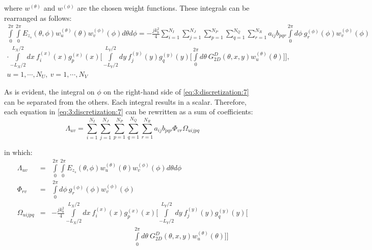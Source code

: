 		\noindent where $w^{(\theta)}$ and $w^{(\phi)}$ are the chosen weight functions. These integrals can be rearranged as follows:
 		\begin{multline}
 			\int\limits_{0}^{2\pi}\int\limits_{0}^{2\pi} E_{z_s}(\theta,\phi) w^{(\theta)}_u(\theta) w^{(\phi)}_v(\phi) d\theta d\phi =
 			-\frac{jk_b^2}{4} \sum\limits_{i=1}^{N_I}\sum\limits_{j=1}^{N_J} \sum\limits_{p=1}^{N_P}\sum\limits_{q=1}^{N_Q}\sum\limits_{r=1}^{N_R} a_{ij} b_{pqr} \int\limits_{0}^{2\pi} d\phi~ g^{(\phi)}_r(\phi) w^{(\phi)}_v(\phi) \\ \cdot  \int\limits_{-L_X/2}^{L_X/2} dx~ f^{(x)}_i(x) g^{(x)}_{p}(x) \Bigg[ \int\limits_{-L_Y/2}^{L_Y/2}  dy~f^{(y)}_j(y) g^{(y)}_{q}(y)
 			   \bigg[ \int\limits_{0}^{2\pi} d\theta~ G^D_{2D}(\theta,x,y) w^{(\theta)}_u(\theta)  \bigg] \Bigg], \\ u = 1,\cdots, N_U,~ v = 1,\cdots,N_V \label{eq:3:discretization:7}
 		\end{multline}
 	
 		As is evident, the integral on $\phi$ on the right-hand side of \eqref{eq:3:discretization:7} can be separated from the others. Each integral results in a scalar. Therefore, each equation in \eqref{eq:3:discretization:7} can be rewritten as a sum of coefficients:
 		\begin{equation}
 			\Lambda_{uv} = \sum\limits_{i=1}^{N_I} \sum\limits_{j=1}^{N_J} \sum\limits_{p=1}^{N_P} \sum\limits_{q=1}^{N_Q} \sum\limits_{r=1}^{N_R} a_{ij} b_{pqr} \Phi_{vr} \Omega_{uijpq} \label{eq:3:discretization:8}
 		\end{equation}
 	
 		\noindent in which:
 		\begin{eqnarray}
 			\Lambda_{uv} &=& \int\limits_{0}^{2\pi}\int\limits_{0}^{2\pi} E_{z_s}(\theta,\phi) w^{(\theta)}_u(\theta) w^{(\phi)}_v(\phi) d\theta d\phi \label{eq:3:discretization:9} \\
 			\Phi_{rv} &=& \int\limits_{0}^{2\pi} d\phi~ g^{(\phi)}_r(\phi) w^{(\phi)}_v(\phi) \label{eq:3:discretization:10} \\
 			\Omega_{uijpq} &=& -\frac{jk_b^2}{4} \int\limits_{-L_X/2}^{L_X/2} dx~ f^{(x)}_i(x) g^{(x)}_{p}(x) \Bigg[ \int\limits_{-L_Y/2}^{L_Y/2}  dy~f^{(y)}_j(y) g^{(y)}_{q}(y) \bigg[ \nonumber \\ && ~~~~~~~~~~~~~~~~~~~~~~~~~~~~~~~~~~~~~~~~~~~~~~~~~~~~\int\limits_{0}^{2\pi} d\theta~ G^D_{2D}(\theta,x,y) w^{(\theta)}_u(\theta)  \bigg] \Bigg] \label{eq:3:discretization:11} 
 		\end{eqnarray}
 	
